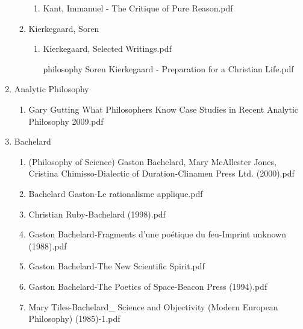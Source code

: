\documentclass[11pt]{article}
\begin{document}
\begin{enumerate}
\begin{enumerate}
\begin{enumerate}
\item Kant, Immanuel - The Critique of Pure Reason.pdf
\label{sec-1-1-1-1-34-25-40-3}
\end{enumerate}

\item Kierkegaard, Soren
\label{sec-1-1-1-1-34-25-41}
\begin{enumerate}
\item Kierkegaard, Selected Writings.pdf
\label{sec-1-1-1-1-34-25-41-1}

\item [philosophy] Soren Kierkegaard - Preparation for a Christian Life.pdf
\label{sec-1-1-1-1-34-25-41-2}
\end{enumerate}
\end{enumerate}

\item Analytic Philosophy
\label{sec-1-1-1-1-34-26}
\begin{enumerate}
\item Gary Gutting What Philosophers Know Case Studies in Recent Analytic Philosophy  2009.pdf
\label{sec-1-1-1-1-34-26-1}
\end{enumerate}

\item Bachelard
\label{sec-1-1-1-1-34-27}
\begin{enumerate}
\item (Philosophy of Science) Gaston Bachelard, Mary McAllester Jones, Cristina Chimisso-Dialectic of Duration-Clinamen Press Ltd. (2000).pdf
\label{sec-1-1-1-1-34-27-1}

\item Bachelard Gaston-Le rationalisme applique.pdf
\label{sec-1-1-1-1-34-27-2}

\item Christian Ruby-Bachelard (1998).pdf
\label{sec-1-1-1-1-34-27-3}

\item Gaston Bachelard-Fragments d'une poétique du feu-Imprint unknown (1988).pdf
\label{sec-1-1-1-1-34-27-4}

\item Gaston Bachelard-The New Scientific Spirit.pdf
\label{sec-1-1-1-1-34-27-5}

\item Gaston Bachelard-The Poetics of Space-Beacon Press (1994).pdf
\label{sec-1-1-1-1-34-27-6}

\item Mary Tiles-Bachelard\_ Science and Objectivity (Modern European Philosophy) (1985)-1.pdf
\label{sec-1-1-1-1-34-27-7}


\end{enumerate}
\end{enumerate}
\end{document}
